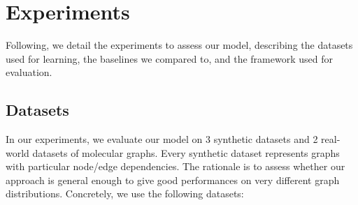 \section{Experiments}
Following, we detail the experiments to assess our model, describing the datasets used for learning, the baselines we compared to, and the framework used for evaluation.

\subsection{Datasets}\label{sec:datasets}
In our experiments, we evaluate our model on 3 synthetic datasets and 2 real-world datasets of molecular graphs. Every synthetic dataset represents graphs with particular node/edge dependencies. The rationale is to assess whether our approach is general enough to give good performances on very different graph distributions. Concretely, we use the following datasets:

